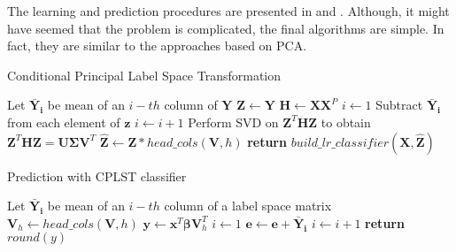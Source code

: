 \documentclass[english,a4paper,twoside]{ppfcmthesis}
\begin{document}
The learning and prediction procedures are presented in  and . Although, it might have seemed that the problem is complicated, the final algorithms are simple. In fact, they are similar to the approaches based on PCA. 

\begin{algorithm}
    \caption{Conditional Principal Label Space Transformation}\label{alg:cplst1}
    \begin{algorithmic}[1]
            \State Let $\boldsymbol{\bar{Y}_i}$ be mean of an $i-th$ column of $\boldsymbol{Y}$
            \State $\boldsymbol{Z} \gets \boldsymbol{Y}$
            \State $\boldsymbol{H} \gets \boldsymbol{X}\boldsymbol{X}^P$
            \State $i \gets 1$
                \State Subtract $\boldsymbol{\bar{Y}_i}$ from each element of $\boldsymbol{z}$ 
                \State $i \gets i+1$ 
            \EndFor
            \State Perform SVD on $\boldsymbol{Z}^T\boldsymbol{H}\boldsymbol{Z}$ to obtain $\boldsymbol{Z}^T\boldsymbol{H}\boldsymbol{Z}=\boldsymbol{U}\boldsymbol{\Sigma} \boldsymbol{V}^T$
            \State $\boldsymbol{\hat{Z}} \gets \boldsymbol{Z} * head\_cols(\boldsymbol{V},h)$
            \State \textbf{return} $build\_lr\_classifier(\boldsymbol{X}, \boldsymbol{\hat{Z}})$
        \EndFunction
    \end{algorithmic}
\end{algorithm}


\begin{algorithm}
    \caption{Prediction with CPLST classifier}\label{alg:cplst2}
    \begin{algorithmic}[1]
            \State Let $\boldsymbol{\bar{Y}_i}$ be mean of an $i-th$ column of a label space matrix
            \State $\boldsymbol{V}_h \gets head\_cols(\boldsymbol{V}, h)$
            \State $\boldsymbol{y} \gets \boldsymbol{x}^T\boldsymbol{\beta}\boldsymbol{V}_h^T$
            \State $i \gets 1$
            \State $\boldsymbol{e} \gets \boldsymbol{e} + \boldsymbol{\bar{Y}_i}$
                \State $i \gets i+1$
            \EndFor
            \State \textbf{return} $round(y)$
        \EndFunction
    \end{algorithmic}
\end{algorithm}
\end{document}
